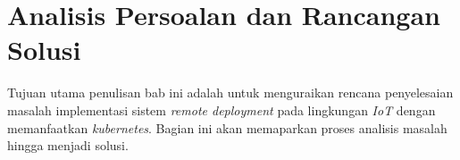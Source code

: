 \chapter{Analisis Persoalan dan Rancangan Solusi}

Tujuan utama penulisan bab ini adalah untuk menguraikan rencana penyelesaian masalah implementasi sistem \textit{remote deployment} pada lingkungan \textit{IoT} dengan memanfaatkan \textit{kubernetes}. Bagian ini akan memaparkan proses analisis masalah hingga menjadi solusi.











